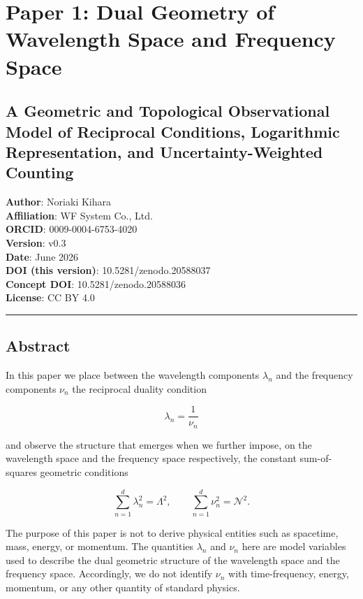 \documentclass[
]{article}
\author{}
\date{}
\begin{document}
\section{Paper 1: Dual Geometry of Wavelength Space and Frequency
Space}\label{paper-1-dual-geometry-of-wavelength-space-and-frequency-space}

\subsection{A Geometric and Topological Observational Model of
Reciprocal Conditions, Logarithmic Representation, and
Uncertainty-Weighted
Counting}\label{a-geometric-and-topological-observational-model-of-reciprocal-conditions-logarithmic-representation-and-uncertainty-weighted-counting}

\textbf{Author}: Noriaki Kihara\\
\textbf{Affiliation}: WF System Co., Ltd.\\
\textbf{ORCID}: 0009-0004-6753-4020\\
\textbf{Version}: v0.3\\
\textbf{Date}: June 2026\\
\textbf{DOI (this version)}: 10.5281/zenodo.20588037\\
\textbf{Concept DOI}: 10.5281/zenodo.20588036\\
\textbf{License}: CC BY 4.0

\begin{center}\rule{0.5\linewidth}{0.5pt}\end{center}

\subsection{Abstract}\label{abstract}

In this paper we place between the wavelength components \(\lambda_n\)
and the frequency components \(\nu_n\) the reciprocal duality condition

\[
\lambda_n=\frac{1}{\nu_n}
\]

and observe the structure that emerges when we further impose, on the
wavelength space and the frequency space respectively, the constant
sum-of-squares geometric conditions

\[
\sum_{n=1}^{d} \lambda_n^2=\Lambda^2,\qquad
\sum_{n=1}^{d} \nu_n^2=\mathcal{N}^2 .
\]

The purpose of this paper is not to derive physical entities such as
spacetime, mass, energy, or momentum. The quantities \(\lambda_n\) and
\(\nu_n\) here are model variables used to describe the dual geometric
structure of the wavelength space and the frequency space. Accordingly,
we do not identify \(\nu_n\) with time-frequency, energy, momentum, or
any other quantity of standard physics.
\end{document}
